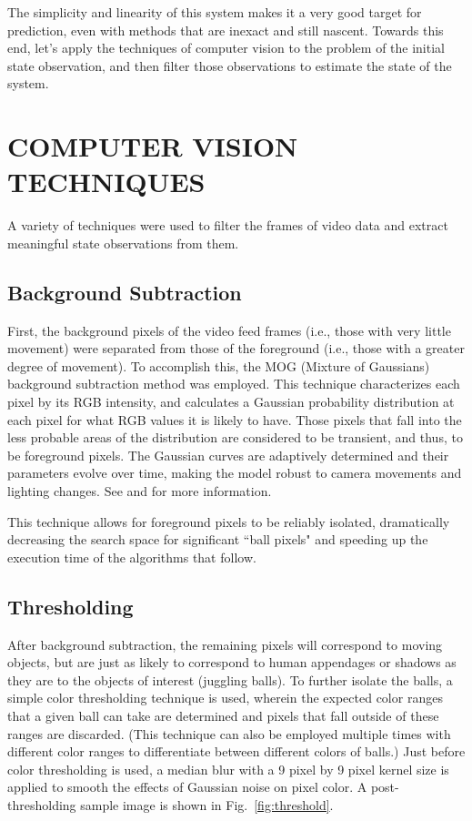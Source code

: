 \documentclass[letterpaper, 10 pt, conference]{ieeeconf}  %
\begin{document}
The simplicity and linearity of this system makes it a very good target for prediction, even with methods that are inexact and still nascent. Towards this end, let's apply the techniques of computer vision to the problem of the initial state observation, and then filter those observations to estimate the state of the system.

\section{COMPUTER VISION TECHNIQUES}

A variety of techniques were used to filter the frames of video data and extract meaningful state observations from them.

\subsection{Background Subtraction}

First, the background pixels of the video feed frames (i.e., those with very little movement) were separated from those of the foreground (i.e., those with a greater degree of movement). To accomplish this, the MOG (Mixture of Gaussians) background subtraction method was employed. This technique characterizes each pixel by its RGB intensity, and calculates a Gaussian probability distribution at each pixel for what RGB values it is likely to have. Those pixels that fall into the less probable areas of the distribution are considered to be transient, and thus, to be foreground pixels. The Gaussian curves are adaptively determined and their parameters evolve over time, making the model robust to camera movements and lighting changes. See \cite{zoran1} and \cite{zoran2} for more information.

This technique allows for foreground pixels to be reliably isolated, dramatically decreasing the search space for significant ``ball pixels" and speeding up the execution time of the algorithms that follow.

\subsection{Thresholding}

After background subtraction, the remaining pixels will correspond to moving objects, but are just as likely to correspond to human appendages or shadows as they are to the objects of interest (juggling balls). To further isolate the balls, a simple color thresholding technique is used, wherein the expected color ranges that a given ball can take are determined and pixels that fall outside of these ranges are discarded. (This technique can also be employed multiple times with different color ranges to differentiate between different colors of balls.) Just before color thresholding is used, a median blur with a 9 pixel by 9 pixel kernel size is applied to smooth the effects of Gaussian noise on pixel color. A post-thresholding sample image is shown in Fig.~\ref{fig:threshold}.
\end{document}
